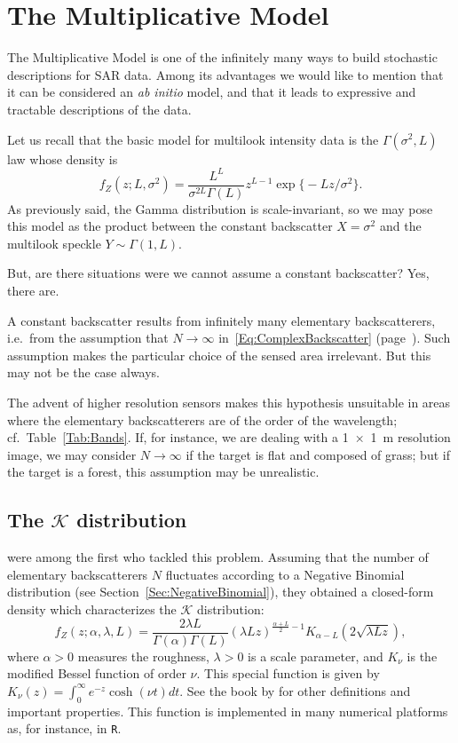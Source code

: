\chapter{The Multiplicative Model}\label{Chapter:MultiplicativeModel}

The Multiplicative Model is one of the infinitely many ways to build stochastic descriptions for SAR data.
Among its advantages we would like to mention that it can be considered an \textit{ab initio} model, and that it leads to expressive and tractable descriptions of the data.

Let us recall that the basic model for multilook intensity data is the $\Gamma(\sigma^2,L)$ law whose density is
\begin{equation}
f_Z(z;L,\sigma^2) = \frac{L^L}{\sigma^{2L}\Gamma(L)} z^{L-1} 
	\exp\big\{ -L z / \sigma^2
	\big\}.
\end{equation}
As previously said, the Gamma distribution is scale-invariant, so we may pose this model as the product between the constant backscatter $X=\sigma^2$ and the multilook speckle $Y\sim\Gamma(1,L)$.

But, are there situations were we cannot assume a constant backscatter?
Yes, there are.

A constant backscatter results from infinitely many elementary backscatterers, i.e.\ from the assumption that $N\to\infty$ in~\eqref{Eq:ComplexBackscatter} (page~\pageref{Eq:ComplexBackscatter}).
Such assumption makes the particular choice of the sensed area irrelevant.
But this may not be the case always.

The advent of higher resolution sensors makes this hypothesis unsuitable in areas where the elementary backscatterers are of the order of the wavelength; cf.\ Table~\ref{Tab:Bands}.
If, for instance, we are dealing with a \SI{1x1}{\meter} resolution image, we may consider $N\to\infty$ if the target is flat and composed of grass;
but if the target is a forest, this assumption may be unrealistic.

\section{The $\mathcal K$ distribution}

\citet{JakemanPusey76} were among the first who tackled this problem.
Assuming that the number of elementary backscatterers $N$ fluctuates according to a Negative Binomial distribution (see Section~\ref{Sec:NegativeBinomial}), they obtained a closed-form density which characterizes the $\mathcal K$ distribution:
\begin{equation}
f_Z(z;\alpha,\lambda,L) =
\frac{2\lambda L}{\Gamma(\alpha)\Gamma(L)} (\lambda L z)^{\frac{\alpha+L}{2}-1} K_{\alpha-L}(2\sqrt{\lambda L z}),
\label{Eq:DensKI}
\end{equation}
where $\alpha>0$ measures the roughness, $\lambda>0$ is a scale parameter, and $K_\nu$ is the modified Bessel function of order $\nu$.
This special function is given by $K_\nu (z) = \int_0^\infty e^{-z} \cosh (\nu t) dt$.
See the book by \citet{Gradshteyn80} for other definitions and important properties.
This function is implemented in many numerical platforms as, for instance, in \texttt R.

